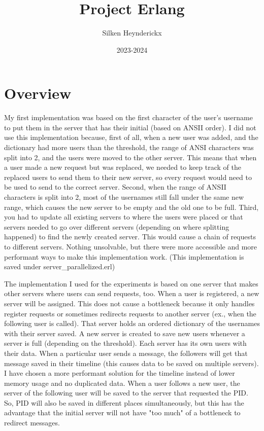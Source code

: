 \documentclass[a4paper]{article}
\title{Project Erlang}
\author{Silken Heynderickx}
\date{2023-2024}
\begin{document}
\maketitle

\tableofcontents

\newpage

\section{Overview}

My first implementation was based on the first character of the user's username to put them in the server that has their initial (based on ANSII order). I did not use this implementation because, first of all, when a new user was added, and the dictionary had more users than the threshold, the range of ANSI characters was split into 2, and the users were moved to the other server. This means that when a user made a new request but was replaced, we needed to keep track of the replaced users to send them to their new server, so every request would need to be used to send to the correct server. Second, when the range of ANSII characters is split into 2, most of the usernames still fall under the same new range, which causes the new server to be empty and the old one to be full. Third, you had to update all existing servers to where the users were placed or that servers needed to go over different servers (depending on where splitting happened) to find the newly created server. This would cause a chain of requests to different servers. Nothing unsolvable, but there were more accessible and more performant ways to make this implementation work. 
(This implementation is saved under server\_parallelized.erl) 

The implementation I used for the experiments is based on one server that makes other servers where users can send requests, too. When a user is registered, a new server will be assigned. This does not cause a bottleneck because it only handles register requests or sometimes redirects requests to another server (ex., when the following user is called). That server holds an ordered dictionary of the usernames with their server saved. A new server is created to save new users whenever a server is full (depending on the threshold). Each server has its own users with their data. When a particular user sends a message, the followers will get that message saved in their timeline (this causes data to be saved on multiple servers). I have chosen a more performant solution for the timeline instead of lower memory usage and no duplicated data. When a user follows a new user, the server of the following user will be saved to the server that requested the PID. So, PID will also be saved in different places simultaneously, but this has the advantage that the initial server will not have "too much" of a bottleneck to redirect messages. 
\end{document}
